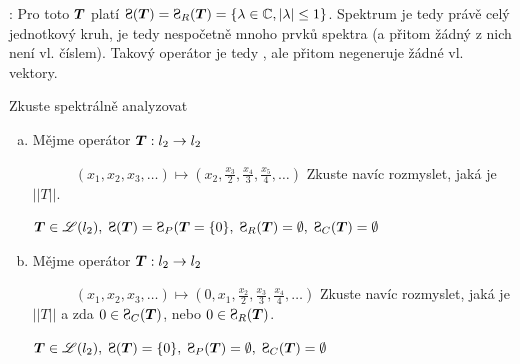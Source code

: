 : Pro toto $\boldsymbol{T}$ platí $\Sp(\map T)=\Sp_R(\map T)=\{ \lambda\in\C,|\lambda|\leq1\}$. Spektrum je tedy právě celý jednotkový kruh, je tedy nespočetně mnoho prvků spektra (a přitom žádný z nich není vl. číslem). Takový operátor je tedy , ale přitom negeneruje žádné vl. vektory.

\Cviceni

Zkuste spektrálně analyzovat
\begin{enumerate}[a)]
\item Mějme operátor $\boldsymbol{T}: l_2\rightarrow l_2$

      $\quad\qquad (x_1,x_2,x_3,\dots)\mapsto \left(x_2,\frac{x_3}{2},\frac{x_4}{3},\frac{x_5}{4},\dots\right)$
      Zkuste navíc rozmyslet, jaká je $||T||$.
      
      
    \textcolor{gray}{ $\map T\in \lin(l_2), \; \Sp(\map T)=\Sp_P(\map T=\{0\},\; \Sp_R(\map T)=\emptyset,\; \Sp_C(\map T)=\emptyset $}
   
   \item Mějme operátor $\boldsymbol{T}: l_2\rightarrow l_2$

      $\quad\qquad (x_1,x_2,x_3,\dots)\mapsto \left(0,x_1,\frac{x_2}{2},\frac{x_3}{3},\frac{x_4}{4},\dots\right)$
Zkuste navíc rozmyslet, jaká je $||T||$ a zda $0\in \Sp_C(\map T)$, nebo $0\in \Sp_R(\map T)$.
      
      
    \textcolor{gray}{ $\map T\in \lin(l_2), \; \Sp(\map T)=\{0\},\; \Sp_P(\map T)=\emptyset,\; \Sp_C(\map T)=\emptyset $}
\end{enumerate}







\pagebreak
